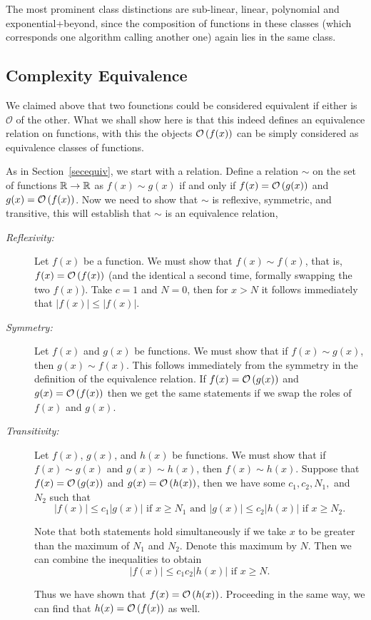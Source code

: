 The most prominent class distinctions are sub-linear, linear, polynomial and
exponential+beyond, since the composition of functions in these classes
(which corresponds one algorithm calling another one)
again lies in the same class.


\subsection{Complexity Equivalence}
\label{equivcomp}

We claimed above that two founctions could be considered equivalent if
either is $\mathcal{O}$ of the other. What we shall show here is that this
indeed defines an equivalence relation on functions, with this the objects
${\mathcal O}\/\left(f(x)\right)$ can be simply considered as equivalence classes of functions.

As in Section~\ref{secequiv}, we start with a relation.
Define a relation $\sim$ on the set of functions ${\mathbb R}\to{\mathbb R}$ as $f(x)\sim g(x)$
if and only if $f(x) = {\mathcal O}\/\left(g(x)\right)$ and $g(x) = {\mathcal O}\/\left(f(x)\right)$. Now 
we need to show that $\sim$ is reflexive, symmetric, and transitive, this
will establish that $\sim$ is an equivalence relation,

\begin{description}
\item[\textit{Reflexivity:}] Let $f(x)$ be a function. We must show that $f(x)\sim
f(x)$, that is, $f(x) = {\mathcal O}\/\left(f(x)\right)$ (and the identical a second time,
formally swapping the two $f(x)$).
Take $c=1$ and $N=0$, then for $x>N$ it follows immediately that $|f(x)| \leq |f(x)|$.

\item[\textit{Symmetry:}] Let $f(x)$ and $g(x)$ be functions. We must show that if $f(x) \sim g(x)$, then $g(x) \sim f(x)$.
This follows immediately from the symmetry in the definition of the equivalence relation. 
If $f(x) = {\mathcal O}\/\left(g(x)\right)$ and $g(x) = {\mathcal O}\/\left(f(x)\right)$
then we get the same statements if we swap the roles of $f(x)$ and $g(x)$.

\item[\textit{Transitivity:}] Let $f(x)$, $g(x)$, and $h(x)$ be functions. We must show that
if $f(x) \sim g(x)$ and $g(x)\sim h(x)$, then $f(x)\sim h(x)$. Suppose that
$f(x) = {\mathcal O}\/\left(g(x)\right)$
and $g(x) = {\mathcal O}\/\left(h(x)\right)$, then we have some $c_1,c_2,N_1,$ and $N_2$ such that
\[
	|f(x)|\leq c_1|g(x)| \text{ if } x\geq N_1 \text{ and } |g(x)|\leq c_2|h(x)| \text{ if } x \geq N_2.
\]

Note that both statements hold simultaneously if we take $x$ to be greater than the maximum of $N_1$ and $N_2$. Denote
this maximum by $N$. Then we can combine the inequalities to obtain
\[
	|f(x)|\leq c_1 c_2|h(x)| \text{ if } x \geq N.
\]

Thus we have shown that $f(x) = {\mathcal O}\/\left(h(x)\right)$. Proceeding in the same way, we can
find that $h(x) = {\mathcal O}\/\left(f(x)\right)$ as well.
\end{description}

